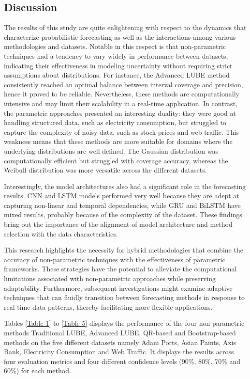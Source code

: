 \subsection{Discussion}
The results of this study are quite enlightening with respect to the dynamics that characterize probabilistic forecasting as well as the interactions among various methodologies and datasets. Notable in this respect is that non-parametric techniques had a tendency to vary widely in performance between datasets, indicating their effectiveness in modeling uncertainty without requiring strict assumptions about distributions. For instance, the Advanced LUBE method consistently reached an optimal balance between interval coverage and precision, hence it proved to be reliable. Nevertheless, these methods are computationally intensive and may limit their scalability in a real-time application.
In contrast, the parametric approaches presented an interesting duality: they were good at handling structured data, such as electricity consumption, but struggled to capture the complexity of noisy data, such as stock prices and web traffic. This weakness means that these methods are more suitable for domains where the underlying distributions are well defined. The Gaussian distribution was computationally efficient but struggled with coverage accuracy, whereas the Weibull distribution was more versatile across the different datasets.

Interestingly, the model architectures also had a significant role in the forecasting results. CNN and LSTM models performed very well because they are adept at capturing non-linear and temporal dependencies, while GRU and BiLSTM have mixed results, probably because of the complexity of the dataset. These findings bring out the importance of the alignment of model architecture and method selection with the data characteristics.

This research highlights the necessity for hybrid methodologies that combine the accuracy of non-parametric techniques with the effectiveness of parametric frameworks. These strategies have the potential to alleviate the computational limitations associated with non-parametric approaches while preserving adaptability. Furthermore, subsequent investigations might examine adaptive techniques that can fluidly transition between forecasting methods in response to real-time data patterns, thereby facilitating more flexible applications.

Tables \ref{Table 1} to \ref{Table 5} displays the performance of the four non-parametric methods Traditional LUBE, Advanced LUBE, QR-based and Bootstrap-based methods on the five different datasets namely Adani Ports, Asian Paints, Axis Bank, Electricity Consumption and Web Traffic. It displays the results across four evaluation metrics and four different confidence levels (90\%, 80\%, 70\% and 60\%) for each method.

